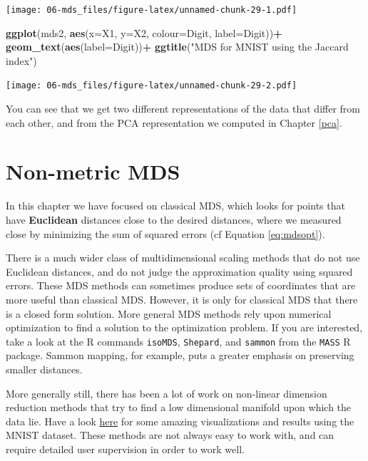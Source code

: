 \documentclass[
]{book}
\newenvironment{Shaded}{\begin{snugshade}}{\end{snugshade}}
\newcommand{\AttributeTok}[1]{\textcolor[rgb]{0.13,0.29,0.53}{#1}}
\newcommand{\FunctionTok}[1]{\textcolor[rgb]{0.13,0.29,0.53}{\textbf{#1}}}
\newcommand{\NormalTok}[1]{#1}
\newcommand{\SpecialCharTok}[1]{\textcolor[rgb]{0.81,0.36,0.00}{\textbf{#1}}}
\newcommand{\StringTok}[1]{\textcolor[rgb]{0.31,0.60,0.02}{#1}}
\theoremstyle{definition}
\theoremstyle{definition}
\theoremstyle{definition}
\theoremstyle{definition}
\theoremstyle{remark}
\begin{document}
\texttt{[image: 06-mds\_files/figure-latex/unnamed-chunk-29-1.pdf]}

\begin{Shaded}
\begin{Highlighting}[]
\FunctionTok{ggplot}\NormalTok{(mds2, }\FunctionTok{aes}\NormalTok{(}\AttributeTok{x=}\NormalTok{X1, }\AttributeTok{y=}\NormalTok{X2, }\AttributeTok{colour=}\NormalTok{Digit, }\AttributeTok{label=}\NormalTok{Digit))}\SpecialCharTok{+}
  \FunctionTok{geom\_text}\NormalTok{(}\FunctionTok{aes}\NormalTok{(}\AttributeTok{label=}\NormalTok{Digit))}\SpecialCharTok{+} 
  \FunctionTok{ggtitle}\NormalTok{(}\StringTok{"MDS for MNIST using the Jaccard index"}\NormalTok{) }
\end{Highlighting}
\end{Shaded}

\texttt{[image: 06-mds\_files/figure-latex/unnamed-chunk-29-2.pdf]}

You can see that we get two different representations of the data that differ from each other, and from the PCA representation we computed in Chapter \ref{pca}.

\section{Non-metric MDS}\label{non-metric-mds}

In this chapter we have focused on classical MDS, which looks for points that have \textbf{Euclidean} distances close to the desired distances, where we measured close by minimizing the sum of squared errors (cf Equation \eqref{eq:mdsopt}).

There is a much wider class of multidimensional scaling methods that do not use Euclidean distances, and do not judge the approximation quality using squared errors. These MDS methods can sometimes produce sets of coordinates that are more useful than classical MDS. However, it is only for classical MDS that there is a closed form solution. More general MDS methods rely upon numerical optimization to find a solution to the optimization problem. If you are interested, take a look at the R commands \texttt{isoMDS}, \texttt{Shepard}, and \texttt{sammon} from the \texttt{MASS} R package. Sammon mapping, for example, puts a greater emphasis on preserving smaller distances.

More generally still, there has been a lot of work on non-linear dimension reduction methods that try to find a low dimensional manifold upon which the data lie. Have a look \href{https://colah.github.io/posts/2014-10-Visualizing-MNIST/}{here} for some amazing visualizations and results using the MNIST dataset. These methods are not always easy to work with, and can require detailed user supervision in order to work well.
\end{document}
